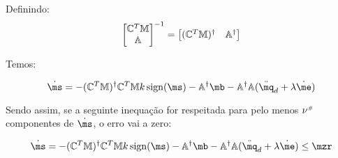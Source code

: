 Definindo:
$$\begin{bmatrix}
\mathbb{C}^T \mathbb{M} \\
\mathbb{A}
\end{bmatrix}^{-1}
=
\begin{bmatrix}
(\mathbb{C}^T \mathbb{M})^\dagger & \mathbb{A}^\dagger
\end{bmatrix} $$

Temos:

$$\dot{\ms} = 
- (\mC^T \mM)^\dagger \mC^T \mM  k  \sign (\ms) - \mA^\dagger\mb - \mA^\dagger \mA(\ddot{\mq}_d  + \lambda \dot{\me}) $$

Sendo assim, se a seguinte inequação for respeitada para pelo menos $\nu^{\scriptscriptstyle \#}$ componentes de $\dot{\ms}$, o erro vai a zero:

$$\dot{\ms} = 
- (\mC^T \mM)^\dagger \mC^T \mM  k  \sign (\ms) - \mA^\dagger\mb - \mA^\dagger \mA(\ddot{\mq}_d  + \lambda \dot{\me}) \leq \mzr $$